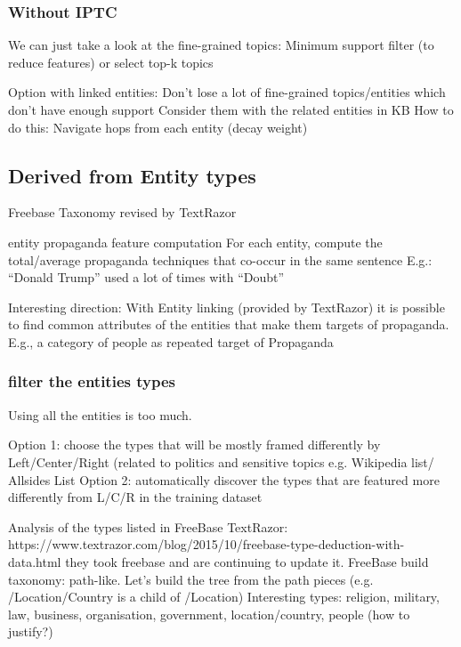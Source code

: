 \subsubsection{Without IPTC}

We can just take a look at the fine-grained topics:
Minimum support filter (to reduce features) or select top-k topics

Option with linked entities:
Don’t lose a lot of fine-grained topics/entities which don’t have enough support
Consider them with the related entities in KB
How to do this: 
Navigate hops from each entity (decay weight)





\subsection{Derived from Entity types}

Freebase Taxonomy revised by TextRazor

entity propaganda feature computation
For each entity, compute the total/average propaganda techniques that co-occur in the same sentence %
E.g.: “Donald Trump” used a lot of times with “Doubt” %

Interesting direction:
With Entity linking (provided by TextRazor) it is possible to find common attributes of the entities that make them targets of %
propaganda. E.g., a category of people as repeated target of Propaganda

\subsubsection{filter the entities types}

Using all the entities is too much.

Option 1: choose the types that will be mostly framed differently by Left/Center/Right (related to politics and sensitive topics e.g. Wikipedia list/ Allsides List
Option 2: automatically discover the types that are featured more differently from L/C/R in the training dataset


Analysis of the types listed in FreeBase
TextRazor: https://www.textrazor.com/blog/2015/10/freebase-type-deduction-with-data.html they took freebase and are continuing to update it.
FreeBase build taxonomy: path-like. Let’s build the tree from the path pieces (e.g. /Location/Country is a child of /Location)
Interesting types: religion, military, law, business, organisation, government, location/country, people (how to justify?)

